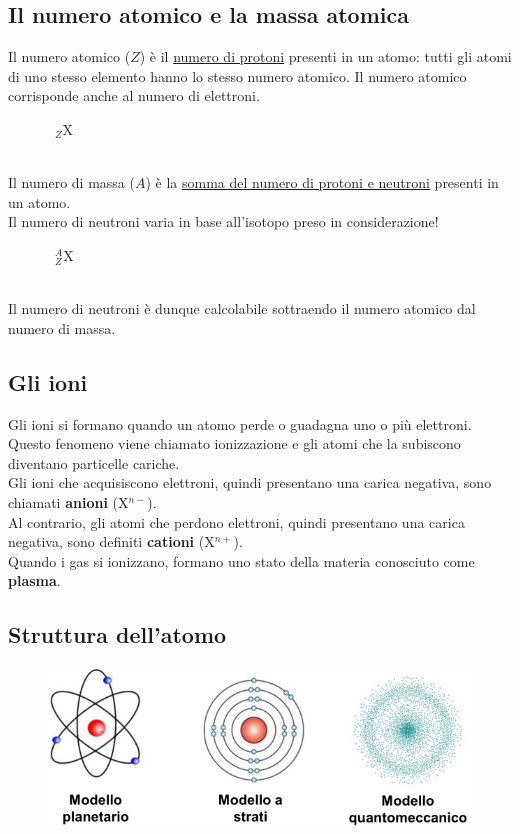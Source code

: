 \documentclass{article}
\begin{document}
\subsection{Il numero atomico e la massa atomica}
    Il numero atomico ($Z$) è il \underline{numero di protoni} presenti in un atomo:
    tutti gli atomi di uno stesso elemento hanno lo stesso numero atomico.
    Il numero atomico corrisponde anche al numero di elettroni.
        \begin{figure}[h]
            \centering {}\: \textrightarrow\ $_Z$X
        \end{figure} \\
    Il numero di massa ($A$) è la \underline{somma del numero di protoni e neutroni} presenti
    in un atomo.\\
    {\color{red}Il numero di neutroni varia in base all'isotopo preso in considerazione!}
        \begin{figure}[h]
            \centering {}\: \textrightarrow\ $^A_Z$X
        \end{figure} \\
    Il numero di neutroni è dunque calcolabile sottraendo il numero atomico dal numero di massa.
        \begin{figure}[h]
            \centering {}
        \end{figure}

\hypertarget{ioni}{}
\subsection{Gli ioni}
    Gli ioni si formano quando un atomo perde o guadagna uno o più elettroni.
    Questo fenomeno viene chiamato ionizzazione e gli atomi che la subiscono diventano
    particelle cariche.\\
    Gli ioni che acquisiscono elettroni, quindi presentano una carica negativa, sono chiamati
    \textbf{anioni} (X$^{n-}$).\\
    Al contrario, gli atomi che perdono elettroni, quindi presentano
    una carica negativa, sono definiti \textbf{cationi} (X$^{n+}$).\\
    Quando i gas si ionizzano, formano uno stato della materia conosciuto come \textbf{plasma}.

\subsection{Struttura dell'atomo}
\begin{figure}[h!]
    \begin{center}
        \includegraphics[width=.6\textwidth]{Struttura_atomi.png}
    \end{center}
\end{figure}
\end{document}
